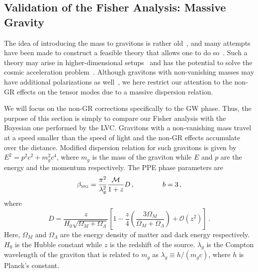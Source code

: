 \documentclass[prd,twocolumn,nofootinbib]{revtex4-1}
\newcommand\be{\begin{equation}}
\newcommand\ee{\end{equation}}
\newcommand{\lb}{\left(}
\newcommand{\rb}{\right)}
\newcommand{\MG}{{\mbox{\tiny MG}}}
\newcommand{\ky}[1]{\textcolor{blue}{\it{\textbf{ky: #1}}} }
\begin{document}

\subsection{Validation of the Fisher Analysis: Massive Gravity}
\label{sec:massive}


The idea of introducing the mass to gravitons is rather old~\cite{Fierz:1939ix}, and many attempts have been made to construct a feasible theory that allows one to do so~\cite{deRham:2014zqa}.  Such a theory may arise in higher-dimensional setups~\cite{Hinterbichler:2011tt} and has the potential to solve the cosmic acceleration problem~\cite{deRham:2014zqa}. Although gravitons with non-vanishing masses may have additional polarizations as well~\cite{dePaula:2004bc}, we here restrict our attention to the non-GR effects on the tensor modes due to a massive dispersion relation.



We will focus on the non-GR corrections specifically to the GW phase. Thus, the purpose of this section is simply to compare our Fisher analysis with the Bayesian one performed by the LVC. Gravitons with a non-vanishing mass travel at a speed smaller than the speed of light and the non-GR effects accumulate over the distance. Modified dispersion relation for such gravitons is given by $ E^2=p^2c^2+m_g^2c^4$, where $m_g$ is the mass of the graviton while $E$ and $p$ are the energy and the momentum respectively. The PPE phase parameters are~\cite{Will:1997bb}
\be
\beta_\MG=\frac{\pi^2}{\lambda_g^2}\frac{\mathcal{M}}{1+z}D\,, \qquad \qquad b=3\,,
\ee
where
\be
D=\frac{z}{H_0\sqrt{\Omega_M+\Omega_{\Lambda}}}\left[1-\frac{z}{4}\left(\frac{3\Omega_M}{\Omega_M+\Omega_{\Lambda}} \right )+\mathcal{O}(z^2)\right]\,.
\ee
Here, $\Omega_M$ and $\Omega_\Lambda$ are the energy density of matter and dark energy respectively. $H_0$ is the Hubble constant while $z$ is the redshift of the source. $\lambda_g$ is the Compton wavelength of the graviton that is related to $m_g$ as $\lambda_g\equiv h/\lb m_gc\rb$, where $h$ is Planck's constant.
\end{document}
